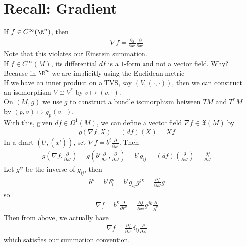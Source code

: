 \documentclass[11pt]{article}
\begin{document}
\section*{Recall: Gradient}
\label{sec:orgcd8d893}
If \(f\in C^{\infty}(\R^{n})\), then\\
\begin{align*}
  \nabla f
  =\frac{\partial f}{\partial x^{i}}\frac{\partial}{\partial x^{i}}
\end{align*}
Note that this violates our Einstein summation.\\
If \(f\in C^{\infty}(M)\), its differential \(df\) is a \(1\)-form and not a vector field. Why? Because in \(\R^{n}\) we are implicitly using the Euclidean metric.\\
If we have an inner product on a TVS, say \((V,(\cdot,\cdot))\), then we can construct an isomorphism \(V\cong V^{*}\) by \(v\mapsto(v,\cdot)\).\\
On \((M,g)\) we use \(g\) to construct a bundle isomorphism between \(TM\) and \(T^{*}M\) by \((p,v)\mapsto g_{p}(v,\cdot)\).\\
With this, given \(df\in\Omega^{1}(M)\), we can define a vector field \(\nabla f\in\mathfrak{X}(M)\) by\\
\begin{align*}
  g(\nabla f,X)=(df)(X)=Xf
\end{align*}
In a chart \((U,(x^{i}))\), set \(\nabla f=b^{i}\frac{\partial}{\partial x^{i}}\). Then\\
\begin{align*}
  g\left( \nabla f,\frac{\partial}{\partial x^{j}} \right)
  =g\left( b^{i}\frac{\partial}{\partial x^{i}},\frac{\partial}{\partial x^{j}} \right)
  =b^{i}g_{ij}
  =(df)\left( \frac{\partial}{\partial x^{j}} \right)
  =\frac{\partial f}{\partial x^{j}}
\end{align*}
Let \(g^{ij}\) be the inverse of \(g_{ij}\), then\\
\begin{align*}
  b^{k}
  =b^{i}\delta_{i}^{k}
  =b^{i}g_{ij}g^{jk}
  =\frac{\partial f}{\partial x^{j}}g^{}
\end{align*}
so\\
\begin{align*}
  \nabla f
  =b^{k}\frac{\partial}{\partial x^{k}}
  =\frac{\partial f}{\partial x^{j}}g^{jk}\frac{\partial}{\partial^{k}}
\end{align*}
Then from above, we actually have\\
\begin{align*}
  \nabla f
  =\frac{\partial f}{\partial x^{i}}\delta_{ij}\frac{\partial}{\partial x^{j}}
\end{align*}
which satisfies our summation convention.\\
\end{document}
